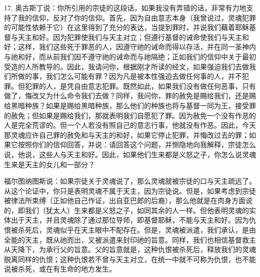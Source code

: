 17. 奥古斯丁说：你所引用的宗徒的这段话，如果我没有弄错的话，非常有力地支持了我的信仰，反对了你的信仰。首先，因为自由意志本身（我曾说过，灵魂犯罪的可能性依赖于它）在这里得到了充分的表达，当提到罪时，并说我们藉着耶稣基督与天主和好。因为犯罪使我们与天主对立；但遵行基督的诫命使我们与天主和好；这样，我们这些死于罪恶的人，因遵守祂的诫命而得以存活，并在同一圣神内与祂和好，而从前我们因不遵守祂的诫命而与祂隔绝；正如我们的信仰中关于最初受造的人所教导的。因此，我请问你，根据刚才所读的经文，如果强迫我们去做我们所做的事，我们怎么可能有罪？因为凡是被本性强迫去做任何事的人，并不犯罪。但犯罪的人，是凭自由意志犯罪。既然如此，如果我们没有做任何恶事，只有做了，悔改又为什么命令我们去做？同样，我问你，罪的赦免是赐给我们，还是赐给黑暗种族？如果是赐给黑暗种族，那么他们的种族也将与基督一同为王，接受罪的赦免；但如果是赐给我们，那就表明我们自愿犯了罪。因为赦免一个没有作恶的人是完全荒谬的。但一个人若没有照自己的意志行事，他就没有作恶。因此，今天那灵魂应许自己罪的赦免和与天主的和好，如果它停止犯罪，并悔改过去的罪；如果它按照你们的信仰回答，并说：请回答这个问题，并恻隐地向我解释，宗徒怎么说，他说，这些人与天主和好。因此，如果他们生来都是义怒之子，你怎么说灵魂生来是天主的女儿和一部分？\par

福尔图纳图斯说：如果宗徒关于灵魂说了，那么灵魂就被宗徒的口与天主疏远了。从这个论证中，你只是表明灵魂不属于天主，因为宗徒说。但是，如果考虑到宗徒被律法所束缚（正如他自己作证，出自亚巴郎的后裔），那么他就是在肉身方面说的，即我们（犹太人）生来都是义怒之子，如同其余的人一样。但他表明灵魂的实体出于天主，并且灵魂除了通过那位导师，即基督耶稣，不能与天主和好。因为仇恨被杀死后，灵魂似乎在天主眼中不配存在。但是，灵魂被派遣，我们承认，是由全能的天主，既从祂而出，又被派遣来封印祂的旨意。同样，我们也相信基督救主从天降下，为承行父的旨意。父的旨意就是，这种仇恨被杀死后，释放我们的灵魂脱离同样的仇恨；这种仇恨若不曾与天主对立，在统一中就不可称为仇恨，也不能说被杀死，或在有生命的地方发生。\par

